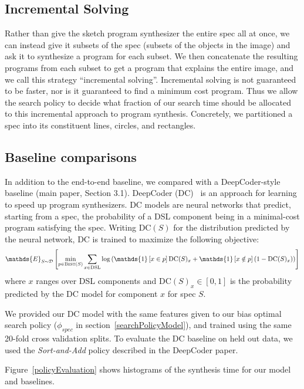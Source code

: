 \documentclass{article}
\newcommand{\indicator}{\mathds{1}} %
\newcommand{\expect}{\mathds{E}} %
\begin{document}
\subsection{Incremental Solving}
Rather than give the sketch program synthesizer the entire spec all at once,
we can instead give it subsets of the spec (subsets of the objects in the image)
and ask it to synthesize a program for each subset.
We then concatenate the resulting programs from each subset to get a program that explains the entire image,
and we call this strategy ``incremental solving''.
Incremental solving is not guaranteed to be faster,
nor is it guaranteed to find a minimum cost program.
Thus we allow the search policy to decide
what fraction of our search time should be allocated to this incremental approach to program synthesis.
Concretely, we partitioned a spec into its constituent lines, circles, and rectangles.
\subsection{Baseline comparisons}
In addition to the end-to-end baseline,
we compared with a DeepCoder-style baseline (main paper, Section 3.1).
DeepCoder (DC)~\cite{BalGauBroetal16}
is an approach for learning to speed up program synthesizers.
DC models are neural networks that
predict, starting from a spec,
the probability of a DSL component being in a minimal-cost program satisfying the spec.
Writing $\text{DC}(S)$ for the distribution predicted by the neural network,
DC is trained to maximize  the following objective:
\begin{equation}
  \expect_{S\sim\mathcal{D}}\left[\min_{p\in \text{\textsc{Best}}(S)} \sum_{x\in \text{DSL}} \log \left(\indicator\left[x\in p \right] \text{DC}(S)_x + \indicator\left[x\notin p \right] (1 - \text{DC}(S)_x)\right)
    \right]
\end{equation}
where $x$ ranges over DSL components and $\text{DC}(S)_x\in \left[0,1 \right]$  is the probability predicted by the DC model for component $x$ for spec $S$.

We provided our DC model with the same features given to our bias optimal search policy ($\phi_{spec}$ in section~\ref{searchPolicyModel}), and trained using the same 20-fold cross validation splits.
To evaluate the DC baseline on held out data,
we used the \emph{Sort-and-Add} policy described in the DeepCoder paper\cite{BalGauBroetal16}.

Figure~\ref{policyEvaluation} shows histograms of the synthesis time for our model and baselines.
\end{document}
